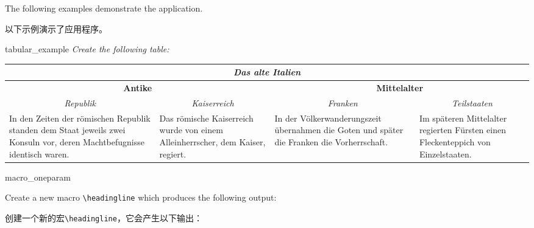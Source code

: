 The following examples demonstrate the application.

以下示例演示了应用程序。

\begin{dispListing}
\tcbstartrecording
\end{dispListing}
\tcbusetemp


\begin{dispExample}
\begin{texercise}{tabular_example}
\textit{Create the following table:}\par\smallskip%
\begin{tcboutputlisting}
\begin{tabular}{|p{3cm}|p{3cm}|p{3cm}|p{3cm}|}\hline
\multicolumn{4}{|c|}{\bfseries\itshape Das alte Italien}\\\hline
\multicolumn{2}{|c|}{\bfseries Antike} &
\multicolumn{2}{c|}{\bfseries Mittelalter}\\\hline
\multicolumn{1}{|c|}{\itshape Republik}&
\multicolumn{1}{c|}{\itshape Kaiserreich}&
\multicolumn{1}{c|}{\itshape Franken}&
\multicolumn{1}{c|}{\itshape Teilstaaten}\\\hline
In den Zeiten der r\"{o}mischen Republik standen dem Staat jeweils zwei
Konsuln vor, deren Machtbefugnisse identisch waren. &
Das r\"{o}mische Kaiserreich wurde von einem Alleinherrscher, dem Kaiser,
regiert.
& In der V\"{o}lkerwanderungszeit \"{u}bernahmen die Goten und sp\"{a}ter die
Franken die Vorherrschaft.
& Im sp\"{a}teren Mittelalter regierten F\"{u}rsten einen Fleckenteppich
von Einzelstaaten.\\\hline
\end{tabular}
\end{tcboutputlisting}
\tcbuselistingtext%
\end{texercise}
\end{dispExample}


\begin{dispExample}
\begin{texercise}{macro_oneparam}
\begin{tcboutputlisting}
\newcommand{\headingline}[1]{%
\begin{center}\Large\bfseries #1\end{center}}
\end{tcboutputlisting}
\tcbuselistingtext%

Create a new macro \verb+\headingline+ which produces the
following output:

创建一个新的宏\verb+\headingline+，它会产生以下输出：
\par\smallskip
\begin{tcbwritetemp}
\end{tcbwritetemp}
\tcbusetemplisting\tcbusetemp%
\end{texercise}
\end{dispExample}



